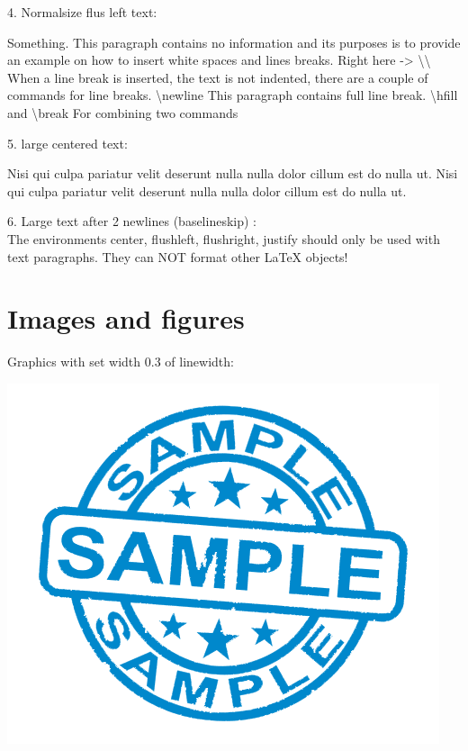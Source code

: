 \documentclass[12pt]{article}
\begin{document}
4. Normalsize flus left text:
\begin{flushleft}
{\normalsize Something. This paragraph contains no information and its purposes is to provide an example on how to insert white spaces and lines breaks. Right here -> \textbackslash\textbackslash \\
When a line break is inserted, the text is not indented, there are a couple of commands for line breaks. \textbackslash newline \newline
This paragraph contains full line break. \textbackslash hfill and \textbackslash break \hfill \break For combining two commands}
\end{flushleft}

5. large centered text:
\begin{center}
{\large Nisi qui culpa pariatur velit deserunt nulla nulla dolor cillum est do nulla ut. Nisi qui culpa pariatur velit deserunt nulla nulla dolor cillum est do nulla ut.}
\end{center}

6. Large text after 2 newlines (baselineskip) : \\[2\baselineskip]

{\Large The environments center, flushleft, flushright, justify should only be used with text paragraphs. They can NOT format other LaTeX objects!}

\newpage

\tableofcontents
\listoffigures
\listoftables
\setcounter{section}{7}

\newpage

\section{Images and figures}

Graphics with set width 0.3 of linewidth: \\
\begin{center}
    \includegraphics[width=0.3\linewidth]{sample.png}
\end{center}
\end{document}
